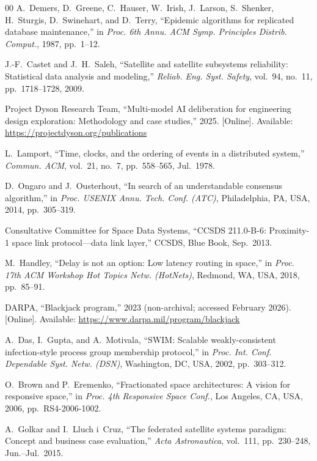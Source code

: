 \documentclass[journal]{IEEEtran}
\begin{document}
\begin{thebibliography}{00}
A.~Demers, D.~Greene, C.~Hauser, W.~Irish, J.~Larson, S.~Shenker, H.~Sturgis, D.~Swinehart, and D.~Terry, ``Epidemic algorithms for replicated database maintenance,'' in \emph{Proc. 6th Annu. ACM Symp. Principles Distrib. Comput.}, 1987, pp.~1--12.

J.-F.~Castet and J.~H.~Saleh, ``Satellite and satellite subsystems reliability: Statistical data analysis and modeling,'' \emph{Reliab. Eng. Syst. Safety}, vol.~94, no.~11, pp.~1718--1728, 2009.


Project Dyson Research Team, ``Multi-model AI deliberation for engineering design exploration: Methodology and case studies,'' 2025. [Online]. Available: \url{https://projectdyson.org/publications}

L.~Lamport, ``Time, clocks, and the ordering of events in a distributed system,'' \emph{Commun. ACM}, vol.~21, no.~7, pp.~558--565, Jul.~1978.

D.~Ongaro and J.~Ousterhout, ``In search of an understandable consensus algorithm,'' in \emph{Proc. USENIX Annu. Tech. Conf. (ATC)}, Philadelphia, PA, USA, 2014, pp.~305--319.

Consultative Committee for Space Data Systems, ``CCSDS 211.0-B-6: Proximity-1 space link protocol---data link layer,'' CCSDS, Blue Book, Sep.~2013.

M.~Handley, ``Delay is not an option: Low latency routing in space,'' in \emph{Proc. 17th ACM Workshop Hot Topics Netw. (HotNets)}, Redmond, WA, USA, 2018, pp.~85--91.

DARPA, ``Blackjack program,'' 2023 (non-archival; accessed February 2026). [Online]. Available: \url{https://www.darpa.mil/program/blackjack}

A.~Das, I.~Gupta, and A.~Motivala, ``SWIM: Scalable weakly-consistent infection-style process group membership protocol,'' in \emph{Proc. Int. Conf. Dependable Syst. Netw. (DSN)}, Washington, DC, USA, 2002, pp.~303--312.

O.~Brown and P.~Eremenko, ``Fractionated space architectures: A vision for responsive space,'' in \emph{Proc. 4th Responsive Space Conf.}, Los Angeles, CA, USA, 2006, pp.~RS4-2006-1002.

A.~Golkar and I.~Lluch i~Cruz, ``The federated satellite systems paradigm: Concept and business case evaluation,'' \emph{Acta Astronautica}, vol.~111, pp.~230--248, Jun.--Jul.~2015.


\end{thebibliography}
\end{document}
